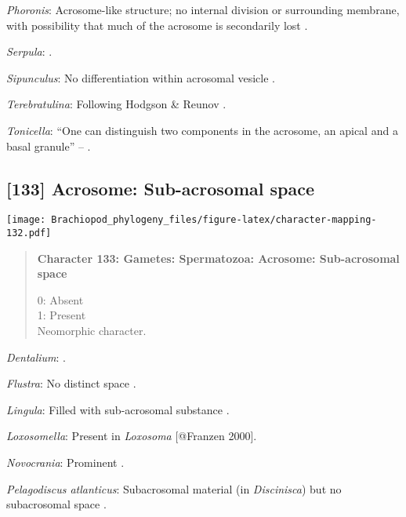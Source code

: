 \documentclass[openany]{book}
\theoremstyle{definition}
\theoremstyle{definition}
\theoremstyle{definition}
\theoremstyle{remark}
\begin{document}
\hypertarget{Phoronis-coding-132}{}
\emph{Phoronis}: Acrosome-like structure; no internal division or
surrounding membrane, with possibility that much of the acrosome is
secondarily lost \citep{Reunov2004Ultrastructuralstudy}.

\hypertarget{Serpula-coding-132}{}
\emph{Serpula}: \citet{Gherardi2011}.

\hypertarget{Sipunculus-coding-132}{}
\emph{Sipunculus}: No differentiation within acrosomal vesicle
\citep{Rice1993}.

\hypertarget{Terebratulina-coding-132}{}
\emph{Terebratulina}: Following Hodgson \& Reunov
\citeyearpar{Hodgson1994Ultrastructureof}.

\hypertarget{Tonicella-coding-132}{}
\emph{Tonicella}: ``One can distinguish two components in the acrosome,
an apical and a basal granule'' -- \citet{BucklandNicks1988}.

\subsection*{{[}133{]} Acrosome: Sub-acrosomal
space}\label{acrosome-sub-acrosomal-space}

\texttt{[image: Brachiopod\_phylogeny\_files/figure-latex/character-mapping-132.pdf]}

\begin{quote}
\textbf{Character 133: Gametes: Spermatozoa: Acrosome: Sub-acrosomal
space}

0: Absent\\
1: Present\\
Neomorphic character.
\end{quote}

\hypertarget{Dentalium-coding-133}{}
\emph{Dentalium}: \citet{DufresneDube1983}.

\hypertarget{Flustra-coding-133}{}
\emph{Flustra}: No distinct space \citep[in
\emph{Tubulipora};][]{Franzen1984}.

\hypertarget{Lingula-coding-133}{}
\emph{Lingula}: Filled with sub-acrosomal substance
\citep{Fukumoto2003Theacrosome}.

\hypertarget{Loxosomella-coding-133}{}
\emph{Loxosomella}: Present in \emph{Loxosoma} {[}@Franzen 2000{]}.

\hypertarget{Novocrania-coding-133}{}
\emph{Novocrania}: Prominent \citep{Afzelius1978Finestructure}.

\hypertarget{Pelagodiscus_atlanticus-coding-133}{}
\emph{Pelagodiscus atlanticus}: Subacrosomal material (in
\emph{Discinisca}) but no subacrosomal space
\citep{Hodgson1994Ultrastructureof}.
\end{document}
